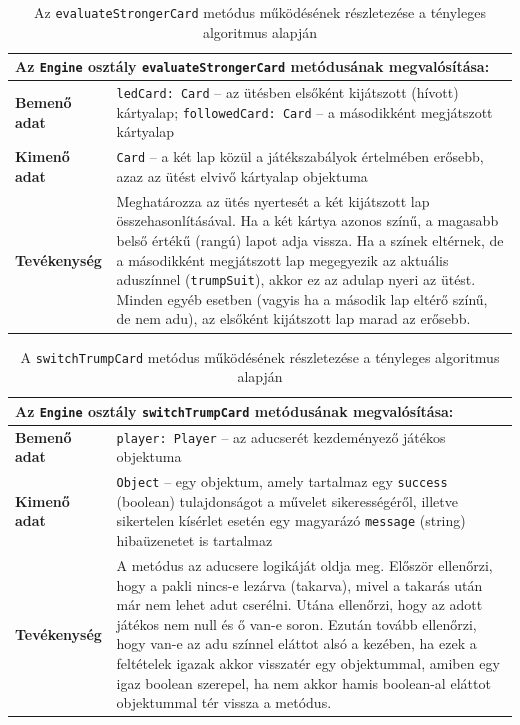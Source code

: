 \begin{table}[H]
    \centering
    \begin{tabular}{| p{} | p{} |}
        \hline
        \multicolumn{2}{|l|}{\textbf{Az \texttt{Engine} osztály \texttt{evaluateStrongerCard} metódusának megvalósítása:}} \\
        \hline
        \textbf{Bemenő adat} & \texttt{ledCard: Card} -- az ütésben elsőként kijátszott (hívott) kártyalap; \texttt{followedCard: Card} -- a másodikként megjátszott kártyalap \\
        \hline
        \textbf{Kimenő adat} & \texttt{Card} -- a két lap közül a játékszabályok értelmében erősebb, azaz az ütést elvivő kártyalap objektuma \\
        \hline
        \textbf{Tevékenység} & Meghatározza az ütés nyertesét a két kijátszott lap összehasonlításával. Ha a két kártya azonos színű, a magasabb belső értékű (rangú) lapot adja vissza. Ha a színek eltérnek, de a másodikként megjátszott lap megegyezik az aktuális aduszínnel (\texttt{trumpSuit}), akkor ez az adulap nyeri az ütést. Minden egyéb esetben (vagyis ha a második lap eltérő színű, de nem adu), az elsőként kijátszott lap marad az erősebb. \\
        \hline
    \end{tabular}
    \caption{Az \texttt{evaluateStrongerCard} metódus működésének részletezése a tényleges algoritmus alapján}
    \label{tab:actual_evaluatestrongercard_spec}
\end{table}


\begin{table}[H]
    \centering
    \begin{tabular}{| p{} | p{} |}
        \hline
        \multicolumn{2}{|l|}{\textbf{Az \texttt{Engine} osztály \texttt{switchTrumpCard} metódusának megvalósítása:}} \\
        \hline
        \textbf{Bemenő adat} & \texttt{player: Player} -- az aducserét kezdeményező játékos objektuma \\
        \hline
        \textbf{Kimenő adat} & \texttt{Object} -- egy objektum, amely tartalmaz egy \texttt{success} (boolean) tulajdonságot a művelet sikerességéről, illetve sikertelen kísérlet esetén egy magyarázó \texttt{message} (string) hibaüzenetet is tartalmaz \\
        \hline
        \textbf{Tevékenység} & A metódus az aducsere logikáját oldja meg. Először ellenőrzi, hogy a pakli nincs-e lezárva (takarva), mivel a takarás után már nem lehet adut cserélni. Utána ellenőrzi, hogy az adott játékos nem null és ő van-e soron. Ezután tovább ellenőrzi, hogy van-e az adu színnel eláttot alsó a kezében, ha ezek a feltételek igazak akkor visszatér egy objektummal, amiben egy igaz boolean szerepel, ha nem akkor hamis boolean-al eláttot objektummal tér vissza a metódus. \\
        \hline
    \end{tabular}
    \caption{A \texttt{switchTrumpCard} metódus működésének részletezése a tényleges algoritmus alapján}
    \label{tab:actual_switchtrumpcard_spec}
\end{table}

